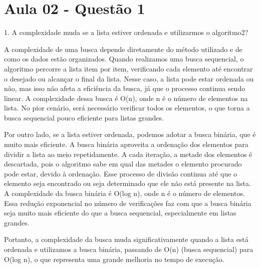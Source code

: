 \section{Aula 02 - Questão 1}

1. A complexidade muda se a lista estiver ordenada e utilizarmos o algoritmo2?

A complexidade de uma busca depende diretamente do método utilizado e de como os dados estão organizados. Quando realizamos uma busca sequencial, o algoritmo percorre a lista item por item, verificando cada elemento até encontrar o desejado ou alcançar o final da lista. Nesse caso, a lista pode estar ordenada ou não, mas isso não afeta a eficiência da busca, já que o processo continua sendo linear. A complexidade dessa busca é O(n), onde n é o número de elementos na lista. No pior cenário, será necessário verificar todos os elementos, o que torna a busca sequencial pouco eficiente para listas grandes.

Por outro lado, se a lista estiver ordenada, podemos adotar a busca binária, que é muito mais eficiente. A busca binária aproveita a ordenação dos elementos para dividir a lista ao meio repetidamente. A cada iteração, a metade dos elementos é descartada, pois o algoritmo sabe em qual das metades o elemento procurado pode estar, devido à ordenação. Esse processo de divisão continua até que o elemento seja encontrado ou seja determinado que ele não está presente na lista. A complexidade da busca binária é O(log n), onde n é o número de elementos. Essa redução exponencial no número de verificações faz com que a busca binária seja muito mais eficiente do que a busca sequencial, especialmente em listas grandes.

Portanto, a complexidade da busca muda significativamente quando a lista está ordenada e utilizamos a busca binária, passando de O(n) (busca sequencial) para O(log n), o que representa uma grande melhoria no tempo de execução.